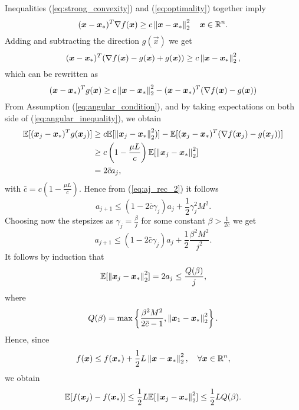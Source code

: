 Inequalities (\ref{eq:strong_convexity}) and (\ref{eq:optimality}) together imply
\begin{equation}
(\boldsymbol{x}-\boldsymbol{x}_*)^T \nabla f(\boldsymbol{x}) \geq c \left\Vert \boldsymbol{x}-\boldsymbol{x}_* \right\Vert^2_2 \quad \boldsymbol{x} \in \mathbb{R}^n.
\end{equation}
Adding and subtracting the direction $g(\vec{x})$ we get
\begin{equation}
(\boldsymbol{x}-\boldsymbol{x}_*)^T (\nabla f(\boldsymbol{x}) -g(\boldsymbol{x}) +g(\boldsymbol{x})) \geq c \left\Vert \boldsymbol{x}-\boldsymbol{x}_* \right\Vert^2_2,
\label{eq:begin_modification}
\end{equation}
which can be rewritten as
\begin{equation}
(\boldsymbol{x}-\boldsymbol{x}_*)^T g(\boldsymbol{x}) \geq c \left\Vert \boldsymbol{x}-\boldsymbol{x}_* \right\Vert^2_2 - (\boldsymbol{x}-\boldsymbol{x}_*)^T (\nabla f(\boldsymbol{x}) -g(\boldsymbol{x}))
\label{eq:angular_inequality}
\end{equation}
From Assumption (\ref{eq:angular_condition}), and by taking expectations on both side of (\ref{eq:angular_inequality}), we obtain
\begin{align}
\mathbb{E}[(\boldsymbol{x}_j-\boldsymbol{x}_*)^T g(\boldsymbol{x}_j)] &\geq c \mathbb{E}[\left\Vert \boldsymbol{x}_j-\boldsymbol{x}_* \right\Vert^2_2)] - \mathbb{E}[(\boldsymbol{x}_j-\boldsymbol{x}_*)^T (\nabla f(\boldsymbol{x}_j) -g(\boldsymbol{x}_j))]\\
&\geq c\left(1-\frac{\mu L}{c}\right) \mathbb{E}[\left\Vert \boldsymbol{x}_j-\boldsymbol{x}_* \right\Vert^2_2]\\
& = 2\bar{c}a_j,
\end{align}
with $\bar{c}=c(1-\frac{\mu L}{c})$.
Hence from (\ref{eq:aj_rec_2}) it follows 
\begin{equation}
a_{j+1} \leq (1-2\bar{c}\gamma_j)a_j + \frac{1}{2}\gamma_j^2M^2.
\end{equation}
Choosing now the stepsizes as $\gamma_j = \frac{\beta}{j}$ for some constant $\beta>\frac{1}{2\bar{c}}$ we get
\begin{equation}
a_{j+1} \leq (1-2\bar{c}\gamma_j)a_j + \frac{1}{2}\frac{\beta^2M^2}{j^2}.
\label{eq:end_modification}
\end{equation}
It follows by induction that
\begin{equation}
\mathbb{E}[\left\Vert \boldsymbol{x}_j - \boldsymbol{x}_* \right\Vert^2_2] = 2a_j\leq \frac{Q(\beta)}{j},
\end{equation}
where 
\begin{equation}
Q(\beta) = \max\left\{\frac{\beta^2M^2}{2\bar{c}-1},\left\Vert \boldsymbol{x}_1 - \boldsymbol{x}_* \right\Vert^2_2 \right\}.
\end{equation}
Hence, since
\begin{equation}
f(\boldsymbol{x})\leq f(\boldsymbol{x}_*) + \frac{1}{2}L\left\Vert \boldsymbol{x} - \boldsymbol{x}_* \right\Vert^2_2, \quad \forall \boldsymbol{x} \in \mathbb{R}^n,
\end{equation}
we obtain
\begin{equation}
\mathbb{E}[f(\boldsymbol{x}_j)-f(\boldsymbol{x}_*)] \leq \frac{1}{2} L \mathbb{E}[\left\Vert \boldsymbol{x}_j - \boldsymbol{x}_* \right\Vert^2_2] \leq \frac{1}{2}LQ(\beta).
\end{equation}

